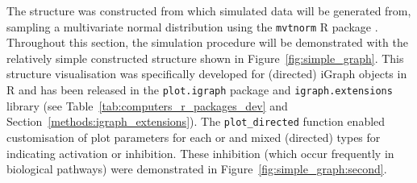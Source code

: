 The  structure was constructed from which simulated data will be generated from, sampling a multivariate normal distribution using the \texttt{mvtnorm} R package \citep{Genz2009, mvtnorm}. Throughout this section, the simulation procedure will be demonstrated with the relatively simple constructed  structure shown in Figure~\ref{fig:simple_graph}. This  structure visualisation was specifically developed for (directed) iGraph objects in R and has been released in the \texttt{plot.igraph} package and \texttt{igraph.extensions} library (see Table~\ref{tab:computers_r_packages_dev} and Section~\ref{methods:igraph_extensions}). The \texttt{plot\_directed} function enabled customisation of plot parameters for each  or  and mixed (directed)  types for indicating activation or inhibition. These inhibition  (which occur frequently in biological pathways) were demonstrated in Figure~\ref{fig:simple_graph:second}.

